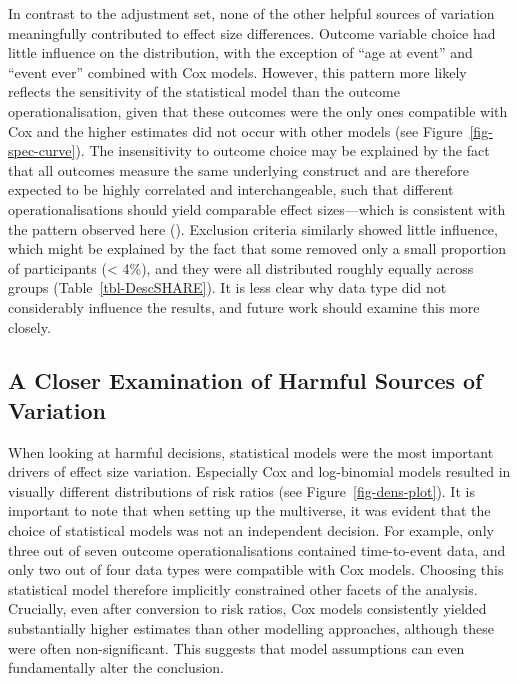 \documentclass[
  man,
  floatsintext,
  longtable,
  nolmodern,
  notxfonts,
  notimes,
  colorlinks=true,linkcolor=blue,citecolor=blue,urlcolor=blue]{apa7}
\begin{document}
In contrast to the adjustment set, none of the other helpful sources of
variation meaningfully contributed to effect size differences. Outcome
variable choice had little influence on the distribution, with the
exception of ``age at event'' and ``event ever'' combined with Cox
models. However, this pattern more likely reflects the sensitivity of
the statistical model than the outcome operationalisation, given that
these outcomes were the only ones compatible with Cox and the higher
estimates did not occur with other models (see
Figure~\ref{fig-spec-curve}). The insensitivity to outcome choice may be
explained by the fact that all outcomes measure the same underlying
construct and are therefore expected to be highly correlated and
interchangeable, such that different operationalisations should yield
comparable effect sizes---which is consistent with the pattern observed
here (). Exclusion
criteria similarly showed little influence, which might be explained by
the fact that some removed only a small proportion of participants
(\textless{} 4\%), and they were all distributed roughly equally across
groups (Table~\ref{tbl-DescSHARE}). It is less clear why data type did
not considerably influence the results, and future work should examine
this more closely.

\subsection{A Closer Examination of Harmful Sources of
Variation}\label{a-closer-examination-of-harmful-sources-of-variation}

When looking at harmful decisions, statistical models were the most
important drivers of effect size variation. Especially Cox and
log-binomial models resulted in visually different distributions of risk
ratios (see Figure~\ref{fig-dens-plot}). It is important to note that
when setting up the multiverse, it was evident that the choice of
statistical models was not an independent decision. For example, only
three out of seven outcome operationalisations contained time-to-event
data, and only two out of four data types were compatible with Cox
models. Choosing this statistical model therefore implicitly constrained
other facets of the analysis. Crucially, even after conversion to risk
ratios, Cox models consistently yielded substantially higher estimates
than other modelling approaches, although these were often
non-significant. This suggests that model assumptions can even
fundamentally alter the conclusion.
\end{document}
